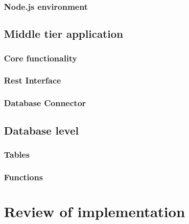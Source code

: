 \subsubsection{Node.js environment}


\subsection{Middle tier application}

\subsubsection{Core functionality}

\subsubsection{Rest Interface}

\subsubsection{Database Connector}


\subsection{Database level}

\subsubsection{Tables}

\subsubsection{Functions}


\section{Review of implementation}